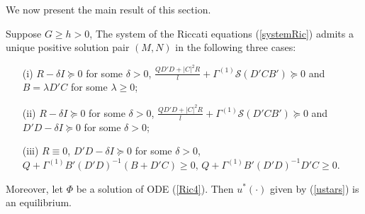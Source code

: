 \documentclass[final]{siamltex}
\begin{document}
We now present the main result of this section.
\begin{theorem}\label{detmain}
Suppose $G\ge h>0$, The system of the Riccati equations (\ref{systemRic}) admits a unique positive solution pair $(M,N)$ in the following three cases:
\begin{itemize}
\item [(i)]$R-\delta I\succeq 0$ for some $\delta>0$,  $\frac{QD'D+|C|^2R}{l}+\Gamma^{(1)}{{\mathcal S}}(D'CB') \succeq 0$ and $B=\lambda D'C$ for some $\lambda\ge 0$;
\item [(ii)]  $R-\delta I\succeq 0$ for some $\delta>0$, $\frac{QD'D+|C|^2R}{l}+\Gamma^{(1)}{{\mathcal S}}(D'CB') \succeq 0$ and $D'D-\delta I\succeq 0$ for some $\delta>0$;
\item [(iii)] $R\equiv 0$, $D'D-\delta I\succeq 0$ for some $\delta>0$, $Q+\Gamma^{(1)} B'(D'D)^{-1}(B+D'C)\ge 0, \, Q+\Gamma^{(1)} B'(D'D)^{-1}D'C\ge 0$.
\end{itemize}
Moreover,
let $\Phi$ be
a solution of ODE (\ref{Ric4}). Then  $u^*(\cdot)$  given by (\ref{ustars}) is an equilibrium.
\end{theorem}
\end{document}
